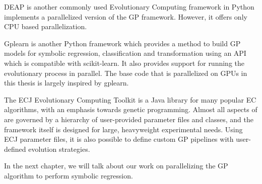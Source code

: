 DEAP\citep{DEAP_JMLR2012} is another commonly used Evolutionary Computing framework in Python implements a parallelized version of the GP framework. However, it offers only CPU based parallelization. 

Gplearn\citep{gplearn} is another Python framework which provides a method to build GP models for symbolic regression, classification and transformation using an API which is compatible with scikit-learn\citep{scikit-learn}. It also provides support for running the evolutionary process in parallel. The base code that is parallelized on GPUs in this thesis is largely inspired by gplearn. 

The ECJ Evolutionary Computing Toolkit\citep{Luke1998ECJSoftware} is a Java library for many popular EC algorithms, with an emphasis towards genetic programming. Almost all aspects of  are governed by a hierarchy of user-provided parameter files and classes, and the framework itself is designed for large, heavyweight experimental needs. Using ECJ parameter files, it is also possible to define custom GP pipelines with user-defined evolution strategies.

In the next chapter, we will talk about our work on parallelizing the GP algorithm to perform symbolic regression.
